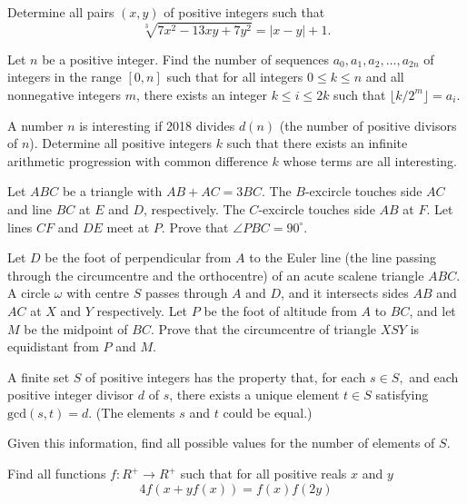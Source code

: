 \documentclass[11pt]{scrartcl}
\begin{document}
\begin{problem}[757902621276461]
	Determine all pairs $(x, y)$ of positive integers such that\[\sqrt[3]{7x^2-13xy+7y^2}=|x-y|+1.\]
\end{problem}
\begin{problem}[758429597657132]
Let $n$ be a positive integer. Find the number of sequences $a_0,a_1,a_2,\dots,a_{2n}$ of integers in the range $[0,n]$ such that for all integers $0\leq k\leq n$ and all nonnegative integers $m$, there exists an integer $k\leq i\leq 2k$ such that $\lfloor k/2^m\rfloor=a_i.$
\end{problem}
\begin{problem}[760097294162073]
	A number $n$ is interesting if 2018 divides $d(n)$ (the number of positive divisors of $n$). Determine all positive integers $k$ such that there exists an infinite arithmetic progression with common difference $k$ whose terms are all interesting.
\end{problem}
\begin{problem}[760426813975831]
Let $ABC$ be a triangle with $AB+AC=3BC$. The $B$-excircle touches side $AC$ and line $BC$ at $E$ and $D$, respectively. The $C$-excircle touches side $AB$ at $F$. Let lines $CF$ and $DE$ meet at $P$. Prove that $\angle PBC = 90^{\circ}$.
\end{problem}
\begin{problem}[762174477377522]
Let $D$ be the foot of perpendicular from $A$ to the Euler line (the line passing through the circumcentre and the orthocentre) of an acute scalene triangle $ABC$. A circle $\omega$ with centre $S$ passes through $A$ and $D$, and it intersects sides $AB$ and $AC$ at $X$ and $Y$ respectively. Let $P$ be the foot of altitude from $A$ to $BC$, and let $M$ be the midpoint of $BC$. Prove that the circumcentre of triangle $XSY$ is equidistant from $P$ and $M$.
\end{problem}
\begin{problem}[770421031902562]
A finite set $S$ of positive integers has the property that, for each $s \in S,$ and each positive integer divisor $d$ of $s$, there exists a unique element $t \in S$ satisfying $\text{gcd}(s, t) = d$. (The elements $s$ and $t$ could be equal.)

Given this information, find all possible values for the number of elements of $S$.
\end{problem}
\begin{problem}[770681078031656]
Find all functions $f:R^+\rightarrow R^+$ such that for all positive reals $x$ and $y$
$$4f(x+yf(x))=f(x)f(2y)$$
\end{problem}
\end{document}
